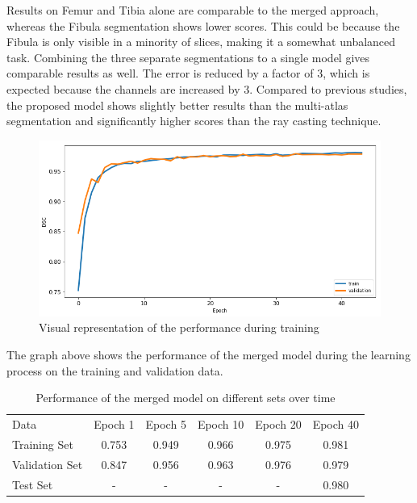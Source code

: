 Results on Femur and Tibia alone are comparable to the merged approach, whereas the Fibula segmentation shows lower scores. This could be because the Fibula is only visible in a minority of slices, making it a somewhat unbalanced task. Combining the three separate segmentations to a single model gives comparable results as well. The error is reduced by a factor of 3, which is expected because the channels are increased by 3. Compared to previous studies, the proposed model shows slightly better results than the multi-atlas segmentation and significantly higher scores than the ray casting technique.

\begin{figure}[H]
  \includegraphics[width=\linewidth]{imgs/train_val.png}
\caption{Visual representation of the performance during training}
\end{figure}

The graph above shows the performance of the merged model during the learning process on the training and validation data. 

\begin{table}[H]
    \centering
    \begin{tabular}{| l | c | c | c | c | c |}
    \hline
    Data       & Epoch 1 & Epoch 5 & Epoch 10 & Epoch 20 & Epoch 40 \\ 
    \Xhline{3\arrayrulewidth}
    Training Set   & 0.753   & 0.949   & 0.966    & 0.975    & 0.981 \\
    \hline
    Validation Set & 0.847   & 0.956   & 0.963    & 0.976    & 0.979 \\
    \hline
    Test Set       &     -   &     -   &     -    &     -    & 0.980 \\
    \hline
    \end{tabular}
    \caption{Performance of the merged model on different sets over time}
\end{table}

